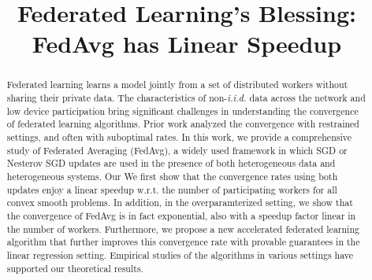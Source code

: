 \documentclass{article}
\title{Federated Learning's Blessing:\\
FedAvg has Linear Speedup}
\author{}
\begin{document}
\maketitle

\begin{abstract}
Federated learning learns
a model jointly from a set of distributed workers without sharing their private
data. The characteristics of non-\emph{i.i.d.} data
across the network and low device participation bring significant challenges
in understanding the convergence of federated learning algorithms. Prior work
analyzed the convergence with restrained settings,
and often with suboptimal rates. 
In this work, we provide a
comprehensive study of Federated Averaging (FedAvg), a widely used framework in which SGD or Nesterov SGD updates are used in the presence of both heterogeneous data and heterogeneous systems.
Our 
We first show that the convergence rates using both updates enjoy a linear speedup w.r.t. the number of participating workers for all convex smooth problems. 
In addition, in the overparamterized setting, we show that the convergence of FedAvg is in fact exponential, also with a speedup factor linear in the number of workers. 
Furthermore, we propose a new accelerated federated learning algorithm that further improves this convergence rate with provable guarantees in the linear regression setting. 
Empirical studies of the algorithms in various settings have supported our theoretical results.
\end{abstract}


%






% 


\newpage




\newpage
\appendix

\end{document}

